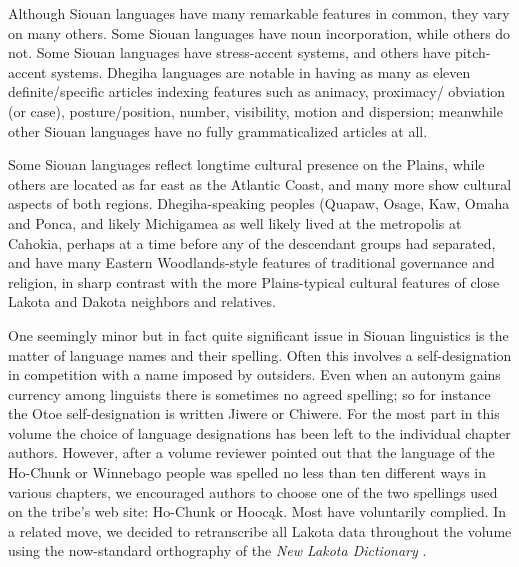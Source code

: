 \begin{refsection}
Although Siouan languages have many remarkable features in common, they vary on many others.  Some Siouan languages have noun incorporation, while others do not. Some Siouan languages have stress-accent systems, and others have pitch-accent systems. Dhegiha languages are notable in having as many as eleven definite/specific articles indexing features such as animacy, proximacy/ obviation (or case), posture/position, number, visibility, motion and dispersion; meanwhile other Siouan languages have no fully grammaticalized articles at all.


Some Siouan languages reflect longtime cultural presence on the Plains, while others are located as far east as the Atlantic Coast, and many more show cultural aspects of both regions. Dhegiha-speaking peoples (Quapaw, Osage, Kaw, Omaha and Ponca, and likely Michigamea as well \citep{KasakTV,Koontz1995} likely lived at the metropolis at Cahokia, perhaps at a time before any of the descendant groups had separated, and have many Eastern Woodlands-style features of traditional governance and religion, in sharp contrast with the more Plains-typical cultural features of close Lakota and Dakota neighbors and relatives.

One seemingly minor but in fact quite significant issue in Siouan linguistics is the matter of language names and their spelling. Often this involves a self-designation in competition with a name imposed by outsiders. Even when an autonym gains currency among linguists there is sometimes no agreed spelling; so for instance the Otoe self-designation is written Jiwere or Chiwere. For the most part in this volume the choice of language designations has been left to the individual chapter authors. However, after a volume reviewer pointed out that the language of the Ho-Chunk or Winnebago people was spelled no less than ten different ways in various chapters, we encouraged authors to choose one of the two spellings used on the tribe's web site:  Ho-Chunk or Hooc\k{a}k.  Most have voluntarily complied.  In a related move, we decided to retranscribe all Lakota data throughout the volume using the now-standard orthography of the \textit{New Lakota Dictionary} \citep{UllrichEtAl2008}.


\end{refsection}
